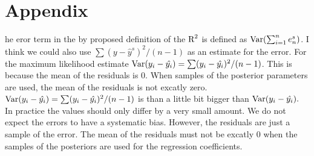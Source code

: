 \documentclass[11pt,a4paper,twoside]{book}\usepackage[]{graphicx}\usepackage[]{color}
\begin{document}






\chapter{Appendix}

he eror term in the by \cite{Gelman2017} proposed definition of the $\text{R}^2$ is defined as $\operatorname{Var}(\sum_{i=1}^{n}e^s_{n})$. I think we could also use $ \sum(y - \hat{y}^s)^2/(n-1) $ as an estimate for the error. For the maximum likelihood estimate $\operatorname{Var}(y_{i} - \hat{y_{i}}) = \sum (y_{i} - \hat{y_{i}})^2/ (n-1) $. This is because the mean of the residuals is 0. When  samples of the posterior parameters are used, the mean of the residuals is not excatly zero. $\operatorname{Var}(y_{i} - \hat{y_{i}}) = \sum (y_{i} - \hat{y_{i}})^2/ (n-1) $ is than a little bit bigger than $\operatorname{Var}(y_{i} - \hat{y_{i}}). $ In practice the values should only differ by a very small amount. We do not expect the errors to have a systematic bias. However, the residuals are just a sample of the error. The mean of the residuals must not be excatly 0 when the samples of the posteriors are used for the regression coefficients.   




\cleardoublepage
{}






 


\cleardoublepage
\end{document}
